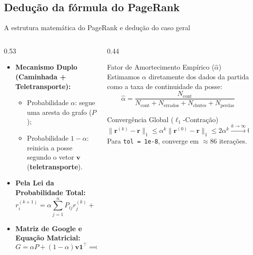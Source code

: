 \documentclass[aspectratio=1610,10pt]{beamer}
\begin{document}
\subsection{Dedução da fórmula do PageRank}
\begin{frame}{A estrutura matemática do PageRank e dedução do caso geral}
  \footnotesize
  \begin{columns}[T,onlytextwidth]
    \begin{column}{0.53\textwidth}
      \begin{itemize}
        \setlength{\itemsep}{5pt}
        \item \textbf{Mecanismo Duplo (Caminhada + Teletransporte):}
        \begin{itemize}
          \footnotesize
          \item Probabilidade $\alpha$: segue uma aresta do grafo ($P$);
          \item Probabilidade $1-\alpha$: reinicia a posse segundo o vetor $\mathbf{v}$ (\textbf{teletransporte}).
        \end{itemize}
        \item \textbf{Pela Lei da Probabilidade Total:}
        \[
          r_i^{(k+1)} = \alpha \sum_{j=1}^{n} P_{ij} r_j^{(k)} + (1-\alpha) v_i
        \]
        \item \textbf{Matriz de Google e Equação Matricial:}
        \[
          G = \alpha P + (1-\alpha)\mathbf{v}\mathbf{1}^{\top} \implies \boxed{\mathbf{r}^{(k+1)} = \alpha P\mathbf{r}^{(k)} + (1-\alpha)\mathbf{v}}
        \]
      \end{itemize}
    \end{column}
    \begin{column}{0.44\textwidth}
      \begin{block}{Fator de Amortecimento Empírico ($\hat{\alpha}$)}
        Estimamos $\alpha$ diretamente dos dados da partida como a taxa de continuidade da posse:
        \[
          \hat{\alpha} = \frac{N_{\text{cont}}}{N_{\text{cont}} + N_{\text{errados}} + N_{\text{chutes}} + N_{\text{perdas}}}
        \]
      \end{block}
      \begin{block}{Convergência Global ($\ell_1$-Contração)}
        \[
          \|\mathbf{r}^{(k)} - \mathbf{r}\|_1 \le \alpha^k \|\mathbf{r}^{(0)} - \mathbf{r}\|_1 \le 2\alpha^k \xrightarrow{k\to\infty} 0
        \]
        Para \texttt{tol = 1e-8}, converge em $\approx 86$ iterações.
      \end{block}
    \end{column}
  \end{columns}
\end{frame}
\end{document}
